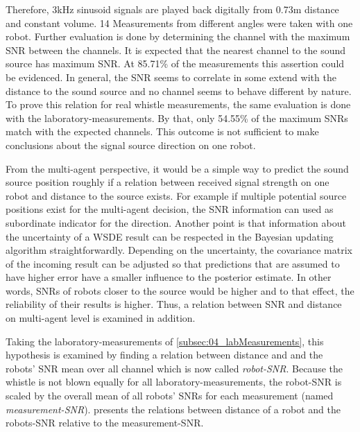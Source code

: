Therefore, 3\si{\kilo\hertz} sinusoid signals are played back digitally from
0.73\si{\meter} distance and constant volume.
14 Measurements from different angles were taken with one robot.
Further evaluation is done by determining the channel with the maximum
\ac{SNR} between the channels.
It is expected that the nearest channel to the sound source has maximum \ac{SNR}.
At 85.71\si{\percent} of the measurements this assertion could be
evidenced.
In general, the \ac{SNR} seems to correlate in some extend with the
distance to the sound source and no channel seems to behave different
by nature.
To prove this relation for real whistle measurements, the same evaluation is
done with the laboratory-measurements.
By that, only 54.55\si{\percent} of the maximum \acp{SNR} match with the expected
channels.
This outcome is not sufficient to make conclusions about the signal source
direction on one robot.

From the multi-agent perspective, it would be a simple way to predict the sound
source position roughly if a relation between received signal strength on one robot
and distance to the source exists.
For example if multiple potential source positions exist for the multi-agent decision,
the \ac{SNR} information can used as subordinate indicator for the direction.
Another point is that information about the uncertainty of a \ac{WSDE} result
can be respected in the Bayesian updating algorithm straightforwardly.
Depending on the uncertainty, the covariance matrix of the incoming result can
be adjusted so that predictions that are assumed to have higher error have
a smaller influence to the posterior estimate.
In other words, \acp{SNR} of robots closer to the source would be higher
and to that effect, the reliability of their results is higher.
Thus, a relation between \ac{SNR} and distance on multi-agent level is examined in addition.


Taking the laboratory-measurements of \cref{subsec:04_labMeasurements}, this
hypothesis is examined by finding a relation between distance and and the robots'
\ac{SNR} mean over all channel which is now called \textit{robot-\ac{SNR}}.
Because the whistle is not blown equally for all laboratory-measurements,
the robot-\ac{SNR} is scaled by the overall mean of all robots' \acp{SNR} for each
measurement (named \textit{measurement-\ac{SNR}}).
 presents the relations between distance of a robot
and the robots-\ac{SNR} relative to the measurement-\ac{SNR}.

